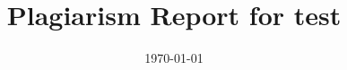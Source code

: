 \documentclass{article}%
\title{\textbf{Plagiarism Report for test}}%
\date{\today}%
\begin{document}
%
\normalsize%
\maketitle%
\end{document}

